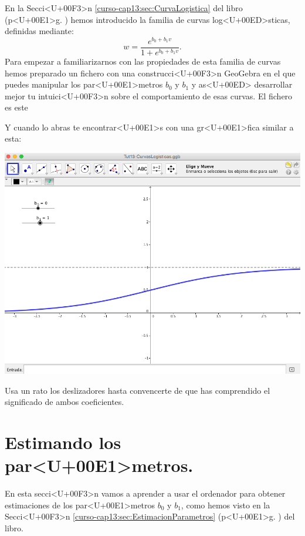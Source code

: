 \documentclass[10pt,a4paper]{article}
\newcounter {cont01}
\begin{document}
En la Secci<U+00F3>n \ref{curso-cap13:sec:CurvaLogistica} del libro (p<U+00E1>g. \pageref{curso-cap13:sec:CurvaLogistica}) hemos introducido la familia de curvas log<U+00ED>sticas, definidas mediante:
\[
  w = \dfrac{e^{b_0+b_1 v}}{1+e^{b_0+b_1 v}}.
\]
Para empezar a familiarizarnos con las propiedades de esta familia de curvas hemos preparado un fichero con una construcci<U+00F3>n GeoGebra en el que puedes manipular los par<U+00E1>metros $b_0$ y $b_1$ y as<U+00ED> desarrollar mejor tu intuici<U+00F3>n sobre el comportamiento de esas curvas. El fichero es este
\begin{center}
\end{center}
Y cuando lo abras te encontrar<U+00E1>s con una gr<U+00E1>fica similar a esta:
\begin{center}
    \includegraphics[width=14cm]{../fig/Tut13-CurvasLogisticasGeoGebra.png}
\end{center}
Usa un rato los deslizadores hasta convencerte de que has comprendido el significado de ambos coeficientes.

\section{Estimando los par<U+00E1>metros.}
\label{tut13:sec:EstimandoParametros}

En esta secci<U+00F3>n vamos a aprender a usar el ordenador para obtener estimaciones de los par<U+00E1>metros $b_0$ y $b_1$, como hemos visto en la Secci<U+00F3>n \ref{curso-cap13:sec:EstimacionParametros} (p<U+00E1>g. \pageref{curso-cap13:sec:EstimacionParametros}) del libro.
\end{document}
